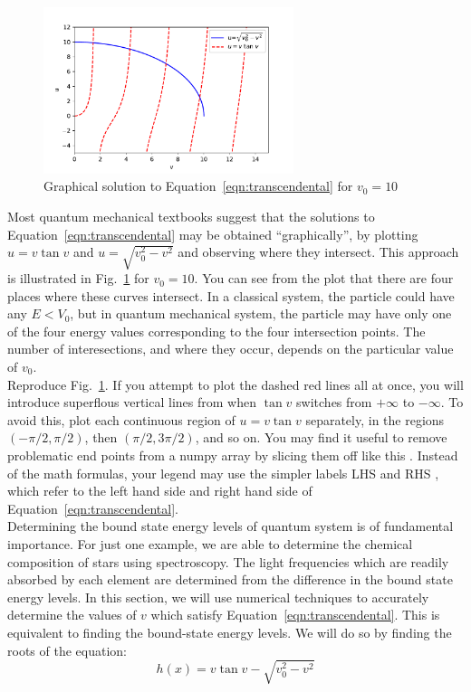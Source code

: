 \begin{figure}[htbp]
\begin{center}
\includegraphics[width=0.65\textwidth]{figs/roots/transcendental.pdf} 
\caption{Graphical solution to Equation~\ref{eqn:transcendental} for $v_0=10$}
\label{fig:transcendental}
\end{center}
\end{figure}

Most quantum mechanical textbooks suggest that the solutions to
Equation~\ref{eqn:transcendental} may be obtained ``graphically'', by
plotting $u = v \tan v$ and $u = \sqrt{v_0^2 - v^2}$ and observing where
they intersect.  This approach is illustrated in
Fig.~\ref{fig:transcendental} for $v_0=10$.  You can see from the plot
that there are four places where these curves intersect.  In a
classical system, the particle could have any $E<V_0$, but in quantum
mechanical system, the particle may have only one of the four energy
values corresponding to the four intersection points. The number of
interesections, and where they occur, depends on the particular value
of $v_0$.\\

\plot Reproduce Fig.~\ref{fig:transcendental}. If you attempt to plot
the dashed red lines all at once, you will introduce
superflous vertical lines from when $\tan v$ switches from $+\infty$ to
$-\infty$.  To avoid this, plot each continuous region of $u = v \tan
v$ separately, in the regions $(-\pi/2,\pi/2)$, then $(\pi/2,3\pi/2)$,
and so on.  You may find it useful to remove problematic end points
from a numpy array by slicing them off like this .
Instead of the math formulas, your legend may use the simpler labels LHS and RHS
, which refer to the left hand side and right hand side of
Equation~\ref{eqn:transcendental}.\\

Determining the bound state energy levels of quantum system is of
fundamental importance.  For just one example, we are able to
determine the chemical composition of stars using spectroscopy.  The
light frequencies which are readily absorbed by each element are
determined from the difference in the bound state energy levels.  In
this section, we will use numerical techniques to accurately determine
the values of $v$ which satisfy Equation~\ref{eqn:transcendental}.
This is equivalent to finding the bound-state energy levels.  We will
do so by finding the roots of the equation:
\begin{equation}
\label{eqn:hx}
h(x) = v \tan v - \sqrt{v_0^2 - v^2}
\end{equation}\\

